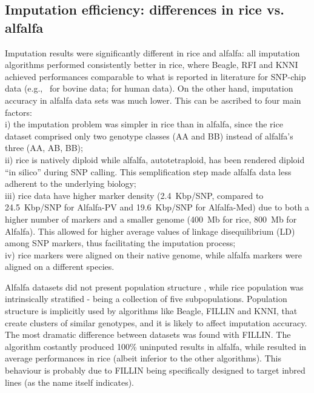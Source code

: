 \subsection{Imputation efficiency: differences in rice vs. alfalfa}
\label{sec:role_of_species}
Imputation results were significantly different in rice and alfalfa: all imputation algorithms performed consistently better in rice, where Beagle, RFI and KNNI achieved performances comparable to what is reported in literature for SNP-chip data (e.g.,~\cite{vanraden_genomic_2013} for bovine data;
\cite{the_1000_genomes_project_consortium_integrated_2012}
for human data). On the other hand, imputation accuracy in alfalfa data sets was much lower. This can be ascribed to four main factors: \\
i) the imputation problem was simpler in rice than in alfalfa, since the rice dataset comprised only two genotype classes (AA and BB) instead of alfalfa's three (AA, AB, BB); \\
ii) rice is natively diploid while alfalfa, autotetraploid, has been rendered diploid ``in silico'' during SNP calling. This semplification step made alfalfa data less adherent to the underlying biology;\\
iii) rice data have higher marker density (2.4~Kbp/SNP, compared to 24.5~Kbp/SNP for Alfalfa-PV and 19.6~Kbp/SNP for Alfalfa-Med) due to both a higher number of markers and a smaller genome (400~Mb for rice, 800~Mb for Alfalfa). This allowed for higher average values of linkage disequilibrium (LD) among SNP markers, thus facilitating the imputation process;\\
iv) rice markers were aligned on their native genome, while alfalfa markers were aligned on a different species.

Alfalfa datasets did not present population structure \cite{Annicchiarico2015}, while rice population was intrinsically stratified - being a collection of five subpopulations. Population structure is implicitly used by algorithms like Beagle, FILLIN and KNNI, that create clusters of similar genotypes, and it is likely to affect imputation accuracy.\\
The most dramatic difference between datasets was found with FILLIN. The algorithm costantly produced 100\% uninputed results in alfalfa, while resulted in average performances in rice (albeit inferior to the other algorithms). This behaviour is probably due to FILLIN being specifically designed to target inbred lines (as the name itself indicates).

